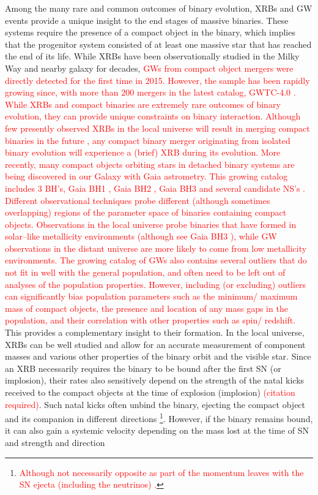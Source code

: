 \documentclass[linenumbers,trackchanges,twocolumn]{aastex701}
\newcommand{\red}{\textcolor{red}}
\begin{document}
Among the many rare and common outcomes of binary evolution, XRBs and GW events provide a unique insight to the end stages of massive binaries. These systems require the presence of a compact object in the binary, which implies that the progenitor system consisted of at least one massive star that has reached the end of its life. While XRBs have been observationally studied in the Milky Way and nearby galaxy for decades, \red{GWs from compact object mergers were directly detected for the first time in 2015. However, the sample has been rapidly growing since, with more than $200$ mergers in the latest catalog, GWTC-4.0 \citep{2025arXiv250818082T,2025arXiv250818083T}. While XRBs and compact binaries are extremely rare outcomes of binary evolution, they can provide unique constraints on binary interaction. Although few presently observed XRBs in the local universe will result in merging compact binaries in the future \citep{2006ARA&A..44...49R, 2022ApJ...929L..26F}, any compact binary merger originating from isolated binary evolution will experience a (brief) XRB during its evolution. More recently, many compact objects orbiting stars in detached binary systems are being discovered in our Galaxy with Gaia astrometry. This growing catalog includes 3 BH's, Gaia BH1 \citep{2023MNRAS.518.1057E}, Gaia BH2 \citep{2023MNRAS.521.4323E}, Gaia BH3 \citep{2024A&A...686L...2G} and several candidate NS's \citep{2024OJAp....7E..58E}. Different observational techniques probe different (although sometimes overlapping) regions of the parameter space of binaries containing compact objects. Observations in the local universe probe binaries that have formed in solar--like metallicity environments (although see Gaia BH3 \cite{2024A&A...686L...2G}), while GW observations in the distant universe are more likely to come from low metallicity environments. The growing catalog of GWs also contains several outliers \citep{2020ApJ...896L..44A,2025arXiv250708219T,2024ApJ...970L..34A} that do not fit in well with the general population, and often need to be left out of analyses of the population properties. However, including (or excluding) outliers can significantly bias population parameters such as the minimum/ maximum mass of compact objects, the presence and location of any mass gaps in the population, and their correlation with other properties such as spin/ redshift.} This provides a complementary insight to their formation. In the local universe, XRBs can be well studied and allow for an accurate measurement of component masses and various other properties of the binary orbit and the visible star. Since an XRB necessarily requires the binary to be bound after the first SN (or implosion), their rates also sensitively depend on the strength of the natal kicks received to the compact objects at the time of explosion (implosion) \red{(citation required)}. Such natal kicks often unbind the binary, ejecting the compact object and its companion in different directions \footnote{\red{Although not necessarily opposite as part of the momentum leaves with the SN ejecta (including the neutrinos) \citep{2020MNRAS.498..899N, 2012ARNPS..62..407J, 2017ApJ...837...84J}.}}. However, if the binary remains bound, it can also gain a systemic velocity depending on the mass lost at the time of SN and strength and direction 
\end{document}
